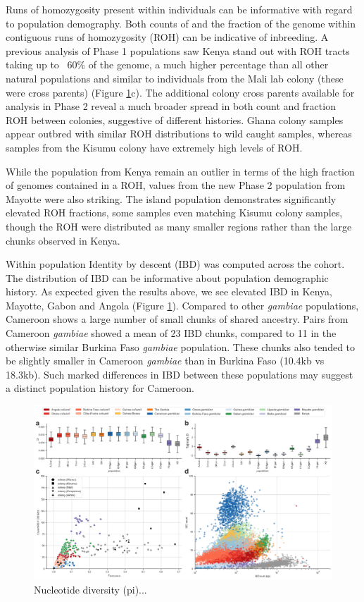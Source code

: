 \documentclass[a4paper,11pt,abstracton,hidelinks]{scrartcl}
\begin{document}
Runs of homozygosity present within individuals can be informative with regard to population demography.
%
Both counts of and the fraction of the genome within contiguous runs of homozygosity (ROH) can be indicative of inbreeding.
%
A previous analysis of Phase 1 populations \cite{Ag1000gConsortium2017} saw Kenya stand out with ROH tracts taking up to ~60\% of the genome, a much higher percentage than all other natural populations and similar to individuals from the  Mali lab colony (these were cross parents) (Figure \ref{div}c). 
%
The additional colony cross parents available for analysis in Phase 2 reveal a much broader spread in both count and fraction ROH between colonies, suggestive of different histories.
%
Ghana colony samples appear outbred with similar ROH distributions to wild caught samples, whereas samples from the Kisumu colony have extremely high levels of ROH.    

While the population from Kenya remain an outlier in terms of the high fraction of genomes contained in a ROH, values from the new Phase 2 population from Mayotte were also striking.
%
The island population demonstrates significantly elevated ROH fractions, some samples even matching Kisumu colony samples, though the ROH were distributed as many smaller regions rather than the large chunks observed in Kenya.

Within population Identity by descent (IBD) was computed across the cohort. 
%
The distribution of IBD can be informative about population demographic history. 
%
As expected given the results above, we see elevated IBD in Kenya, Mayotte, Gabon and Angola (Figure \ref{div}).
%
Compared to other \emph{gambiae} populations, Cameroon shows a large number of small chunks of shared ancestry.
%
Pairs from Cameroon \emph{gambiae} showed a mean of 23 IBD chunks, compared to 11 in the otherwise similar Burkina Faso \emph{gambiae} population.
%
These chunks also tended to be slightly smaller in Cameroon \emph{gambiae} than in Burkina Faso (10.4kb vs 18.3kb). 
%
Such marked differences in IBD between these populations may suggest a distinct population history for Cameroon.


\begin{figure}[H]
	\begin{center}
		\includegraphics*[width=6.3in]{artwork/diversity_composite.jpeg}
	\end{center}
	\caption{Nucleotide diversity (pi)...}
	\label{div}
\end{figure}
\end{document}
